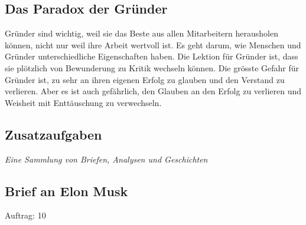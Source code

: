 \documentclass[10pt]{article}
\begin{document}
\subsection{Das Paradox der Gründer}

Gründer sind wichtig, weil sie das Beste aus allen Mitarbeitern herausholen können, nicht nur weil ihre Arbeit wertvoll ist.
Es geht darum, wie Menschen und Gründer unterschiedliche Eigenschaften haben.
Die Lektion für Gründer ist, dass sie plötzlich von Bewunderung zu Kritik wechseln können.
Die grösste Gefahr für Gründer ist, zu sehr an ihren eigenen Erfolg zu glauben und den Verstand zu verlieren. Aber es ist auch gefährlich, den Glauben an den Erfolg zu verlieren und Weisheit mit Enttäuschung zu verwechseln.

\clearpage


\begin{center}
    \section*{Zusatzaufgaben}
    \textit{Eine Sammlung von Briefen, Analysen und Geschichten}
\end{center}

\subsection*{Brief an Elon Musk}

\begin{description}
    \item[Auftrag: 10]
\end{description}
\end{document}

